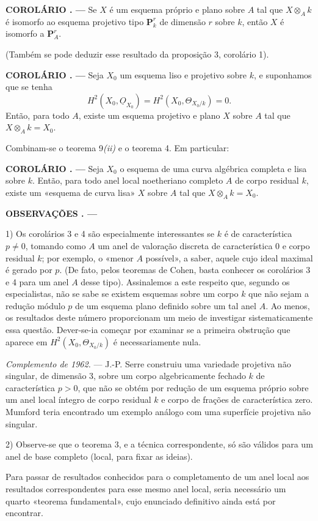 \documentclass[11pt,twoside,openany]{book}
\numberwithin{equation}{section}
\newcommand{\Osh}{\underline{O}}
\theoremstyle{plain}
\theoremstyle{definition}
\theoremstyle{remark}
\newcommand{\result}[2]{%
  \par\medskip\noindent\textbf{#1%
  \if\relax\detokenize{#2}\relax\else\space#2\fi. ---}\enspace
}
\begin{document}
\result{COROLÁRIO}{2} Se $X$ é um esquema próprio e plano sobre $A$ tal que
$X\otimes_A k$ é isomorfo ao esquema projetivo tipo $\mathbf P_k^r$ de
dimensão $r$ sobre $k$, então $X$ é isomorfo a $\mathbf P_A^r$.

(Também se pode deduzir esse resultado da proposição 3, corolário 1).

\result{COROLÁRIO}{3} Seja $X_0$ um esquema liso e projetivo sobre $k$, e
suponhamos que se tenha
\[
  H^2(X_0,\Osh_{X_0})=H^2(X_0,\Theta_{X_0/k})=0.
\]
Então, para todo $A$, existe um esquema projetivo e plano $X$ sobre $A$ tal
que $X\otimes_A k=X_0$.

Combinam-se o teorema 9\textit{(ii)} e o teorema 4. Em particular:

\result{COROLÁRIO}{4} Seja $X_0$ o esquema de uma curva algébrica completa e
lisa sobre $k$. Então, para todo anel local noetheriano completo $A$ de
corpo residual $k$, existe um «esquema de curva lisa» $X$ sobre $A$ tal que
$X\otimes_A k=X_0$.

\result{OBSERVAÇÕES}{}

1) Os corolários 3 e 4 são especialmente interessantes se $k$ é de
característica $p\ne0$, tomando como $A$ um anel de valoração discreta de
característica $0$ e corpo residual $k$; por exemplo, o «menor $A$ possível»,
a saber, aquele cujo ideal maximal é gerado por $p$. (De fato, pelos
teoremas de Cohen, basta conhecer os corolários 3 e 4 para um anel $A$ desse
tipo). Assinalemos a este respeito que, segundo os especialistas, não se sabe se
existem esquemas sobre um corpo $k$ que não sejam a redução módulo $p$ de um
esquema plano definido sobre um tal anel $A$. Ao menos, os resultados deste
número proporcionam um meio de investigar sistematicamente essa questão. Dever-se-ia
começar por examinar se a primeira obstrução que aparece em
$H^2(X_0,\Theta_{X_0/k})$ é necessariamente nula.

\emph{Complemento de 1962.} --- J.-P. Serre construiu uma variedade
projetiva não singular, de dimensão 3, sobre um corpo algebricamente fechado
$k$ de característica $p>0$, que não se obtém por redução de um esquema
próprio sobre um anel local íntegro de corpo residual $k$ e corpo de
frações de característica zero. Mumford teria encontrado um exemplo análogo
com uma superfície projetiva não singular.

2) Observe-se que o teorema 3, e a técnica correspondente, só são válidos para
um anel de base completo (local, para fixar as ideias).

Para passar de resultados conhecidos para o completamento de um anel local aos
resultados correspondentes para esse mesmo anel local, seria necessário um
quarto «teorema fundamental», cujo enunciado definitivo ainda está por encontrar.
\end{document}
